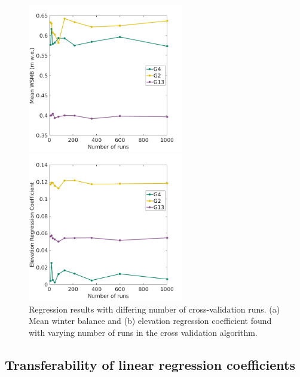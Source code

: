 \documentclass{sfuthesis}
\begin{document}
\begin{figure}[t]
\begin{minipage}[l][8cm][t]{.58\textwidth}
        \vspace*{\fill}
  \centering
  \includegraphics[height=6.5cm]{MLRrunWSMB.png}
  \subcaption{}
\end{minipage}%
\begin{minipage}[l][8cm][t]{.38\textwidth}
        \vspace*{\fill} 
          \centering
         \includegraphics[height=6.5cm]{MLRrunCoeffs.png}
  \subcaption{}
  \end{minipage}%

\caption[Regression results with differing number of cross-validation runs]{Regression results with differing number of cross-validation runs. (a) Mean winter balance and (b) elevation regression coefficient found with varying number of runs in the cross validation algorithm. }
\label{fig:MLRruns}
\end{figure}



\subsection{Transferability of linear regression coefficients}
\label{sec:transferability}
\end{document}
